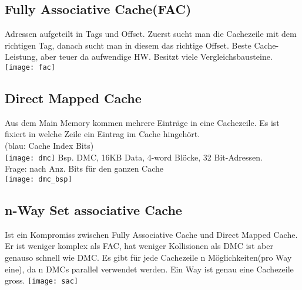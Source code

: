 \subsection{Fully Associative Cache(FAC)}
Adressen aufgeteilt in Tags und Offset. Zuerst sucht man die Cachezeile mit dem richtigen Tag, danach sucht man in diesem das richtige Offset. Beste Cache-Leistung, aber teuer da aufwendige HW. Besitzt viele Vergleichsbausteine.
\texttt{[image: fac]}
\subsection{Direct Mapped Cache}
Aus dem Main Memory kommen mehrere Einträge in eine Cachezeile. Es ist fixiert in welche Zeile ein Eintrag im Cache hingehört.\\
(blau: Cache Index Bits)\\
\texttt{[image: dmc]}
\textcolor{myblue}{Bsp.} DMC, 16KB Data, 4-word Blöcke, 32 Bit-Adressen.\\
Frage: nach Anz. Bits für den ganzen Cache\\
\texttt{[image: dmc\_bsp]}
\subsection{n-Way Set associative Cache}
Ist ein Kompromiss zwischen Fully Associative Cache und Direct Mapped Cache. Er ist weniger komplex als FAC, hat weniger Kollisionen als DMC ist aber genauso schnell wie DMC. Es gibt für jede Cachezeile n Möglichkeiten(pro Way eine), da n DMCs parallel verwendet werden. Ein Way ist genau eine Cachezeile gross.
\texttt{[image: sac]}
